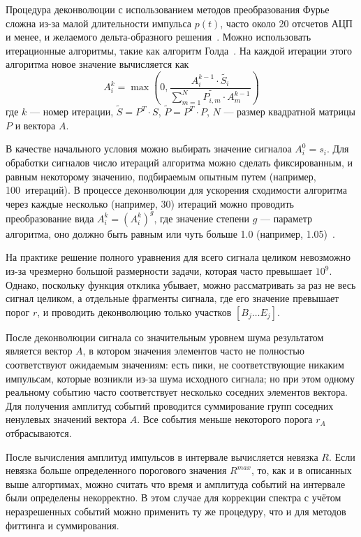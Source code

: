 Процедура деконволюции с использованием методов преобразования Фурье сложна из-за малой длительности импульса $p(t)$, часто около 20 отсчетов АЦП и менее, и желаемого дельта-образного решения~\cite{Morhac2011}. Можно использовать итерационные алгоритмы, такие как алгоритм Голда~\cite{Gold1964}. На каждой итерации этого алгоритма новое значение вычисляется как
\begin{equation*}
  A_i^k = \max \left( 0, \frac{A_i^{k-1} \cdot \widetilde{S_i} }{ \sum_{m=1}^{N} \widetilde{ P_{i,m} } \cdot A_m^{k-1} } \right)
\end{equation*}
где $k$ --- номер итерации, $\widetilde{S} = P^{T} \cdot S $, $\widetilde{P} = P^{T} \cdot P$, $N$ --- размер квадратной матрицы $P$ и вектора $A$.

В качестве начального условия можно выбирать значение сигналоа $A_i^0 = s_i$. Для обработки сигналов число итераций алгоритма можно сделать фиксированным, и равным некоторому значению, подбираемым опытным путем (например, 100~итераций). В процессе деконволюции для ускорения сходимости алгоритма через каждые несколько (например, 30) итераций можно проводить преобразование вида $A_i^k = \left( A_i^k \right)^g$, где значение степени $g$ --- параметр алгоритма, оно должно быть равным или чуть больше 1.0 (например, 1.05)~\cite{Morhac2011, Khilkevitch2020}.

На практике решение полного уравнения для всего сигнала целиком невозможно из-за чрезмерно большой размерности задачи, которая часто превышает $10^9$. Однако, поскольку функция отклика убывает, можно рассматривать за раз не весь сигнал целиком, а отдельные фрагменты сигнала, где его значение превышает порог $r$, и проводить деконволюцию только участков $\left[ B_j \ldots E_j \right] $. 

После деконволюции сигнала со значительным уровнем шума результатом является вектор $A$, в котором значения элементов часто не полностью соответствуют ожидаемым значениям: есть пики, не соответствующие никаким импульсам, которые возникли из-за шума исходного сигнала; но при этом одному реальному событию часто соответствует несколько соседних элементов вектора. Для получения амплитуд событий проводится суммирование групп соседних ненулевых значений вектора $A$. Все события меньше некоторого порога $r_A$ отбрасываются.

После вычисления амплитуд импульсов в интервале вычисляется невязка $R$. Если невязка больше определенного порогового значения $R^{max}$, то, как и в описанных выше алгортимах, можно считать что время и амплитуда событий на интервале были определены некорректно. В этом случае для коррекции спектра с учётом неразрешенных событий можно применить ту же процедуру, что и для методов фиттинга и суммирования.

